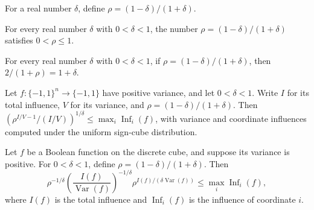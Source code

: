 \begin{definition}
\label{FABL.exercise9_30Rho}
\leanok
For a real number $\delta$, define $\rho=(1-\delta)/(1+\delta)$.
\end{definition}

\begin{theorem}
\label{FABL.exercise9_30Rho_mem_Ioc}
\leanok
{}
For every real number $\delta$ with $0<\delta<1$, the number
$\rho=(1-\delta)/(1+\delta)$ satisfies $0<\rho\le1$.
\end{theorem}

\begin{theorem}
\label{FABL.exercise9_30_exponent_identity}
\leanok
{}
For every real number $\delta$ with $0<\delta<1$, if $\rho=(1-\delta)/(1+\delta)$, then
$2/(1+\rho)=1+\delta$.
\end{theorem}

\begin{theorem}
\label{FABL.exercise9_30_compact}
\leanok
{}
Let $f:\{−1,1\}^n\to\{−1,1\}$ have positive variance, and let $0<\delta<1$. Write $I$
for its total influence, $V$ for its variance, and $\rho=(1-\delta)/(1+\delta)$. Then
$\left(\rho^{I/V-1}/(I/V)\right)^{1/\delta}\le \max_i\operatorname{Inf}_i(f)$, with
variance and coordinate influences computed under the uniform sign-cube distribution.
\end{theorem}

\begin{theorem}
\label{FABL.exercise9_30_rho_form}
\leanok
{}
Let $f$ be a Boolean function on the discrete cube, and suppose its variance is
positive. For $0<\delta<1$, define $\rho=(1-\delta)/(1+\delta)$. Then
\[
\rho^{-1/\delta}\left(\frac{I(f)}{\operatorname{Var}(f)}\right)^{-1/\delta}\rho^{I(f)/(\delta\operatorname{Var}(f))}\leq
\max_i \operatorname{Inf}_i(f),
\]
where $I(f)$ is the total influence and $\operatorname{Inf}_i(f)$ is the influence of
coordinate $i$.
\end{theorem}


